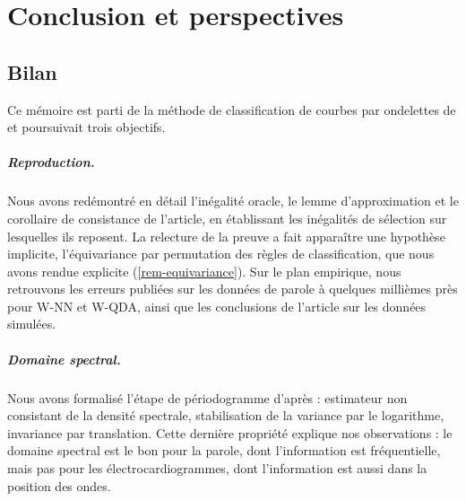 \chapter{Conclusion et perspectives}\label{chap-conclusion}

\section{Bilan}

Ce mémoire est parti de la méthode de classification de courbes par ondelettes de \citet{berlinet2008functional} et poursuivait trois objectifs.

\paragraph{Reproduction.} Nous avons redémontré en détail l'inégalité oracle, le lemme d'approximation et le corollaire de consistance de l'article, en établissant les inégalités de sélection sur lesquelles ils reposent. La relecture de la preuve a fait apparaître une hypothèse implicite, l'équivariance par permutation des règles de classification, que nous avons rendue explicite (\cref{rem-equivariance}). Sur le plan empirique, nous retrouvons les erreurs publiées sur les données de parole à quelques millièmes près pour W-NN et W-QDA, ainsi que les conclusions de l'article sur les données simulées.

\paragraph{Domaine spectral.} Nous avons formalisé l'étape de périodogramme d'après \citet{shumway2011time} : estimateur non consistant de la densité spectrale, stabilisation de la variance par le logarithme, invariance par translation. Cette dernière propriété explique nos observations : le domaine spectral est le bon pour la parole, dont l'information est fréquentielle, mais pas pour les électrocardiogrammes, dont l'information est aussi dans la position des ondes.

